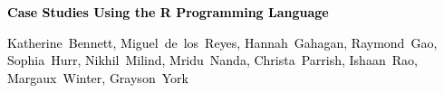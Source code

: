 \documentclass[11pt]{book} %
\begin{document}

\begingroup
\thispagestyle{empty}
\centering
\vspace*{8cm}
\par\normalfont\fontsize{35}{35}\sffamily\selectfont
\textbf{\textcolor{black}{Case Studies Using the R Programming Language}}\\
{\LARGE }\par %
{\Large\textcolor{black}{ Katherine~Bennett, Miguel~de~los~Reyes, Hannah~Gahagan, Raymond~Gao, Sophia~Hurr, Nikhil~Milind, Mridu~Nanda, Christa~Parrish, Ishaan~Rao, Margaux~Winter, Grayson~York}}\par %
\endgroup
\end{document}
